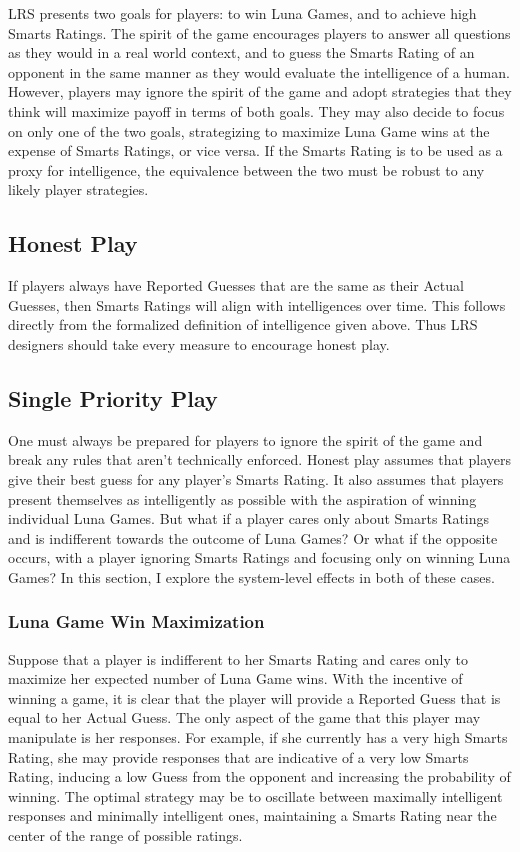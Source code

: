 LRS presents two goals for players: to win Luna Games, and to achieve high Smarts Ratings. The spirit of the game encourages players to answer all questions as they would in a real world context, and to guess the Smarts Rating of an opponent in the same manner as they would evaluate the intelligence of a human. However, players may ignore the spirit of the game and adopt strategies that they think will maximize payoff in terms of both goals. They may also decide to focus on only one of the two goals, strategizing to maximize Luna Game wins at the expense of Smarts Ratings, or vice versa. If the Smarts Rating is to be used as a proxy for intelligence, the equivalence between the two must be robust to any likely player strategies.

\subsection{Honest Play}

If players always have Reported Guesses that are the same as their Actual Guesses, then Smarts Ratings will align with intelligences over time. This follows directly from the formalized definition of intelligence given above. Thus LRS designers should take every measure to encourage honest play.

\subsection{Single Priority Play}

One must always be prepared for players to ignore the spirit of the game and break any rules that aren't technically enforced. Honest play assumes that players give their best guess for any player's Smarts Rating. It also assumes that players present themselves as intelligently as possible with the aspiration of winning individual Luna Games. But what if a player cares only about Smarts Ratings and is indifferent towards the outcome of Luna Games? Or what if the opposite occurs, with a player ignoring Smarts Ratings and focusing only on winning Luna Games? In this section, I explore the system-level effects in both of these cases.

\subsubsection{Luna Game Win Maximization}

Suppose that a player is indifferent to her Smarts Rating and cares only to maximize her expected number of Luna Game wins. With the incentive of winning a game, it is clear that the player will provide a Reported Guess that is equal to her Actual Guess. The only aspect of the game that this player may manipulate is her responses. For example, if she currently has a very high Smarts Rating, she may provide responses that are indicative of a very low Smarts Rating, inducing a low Guess from the opponent and increasing the probability of winning. The optimal strategy may be to oscillate between maximally intelligent responses and minimally intelligent ones, maintaining a Smarts Rating near the center of the range of possible ratings. 

